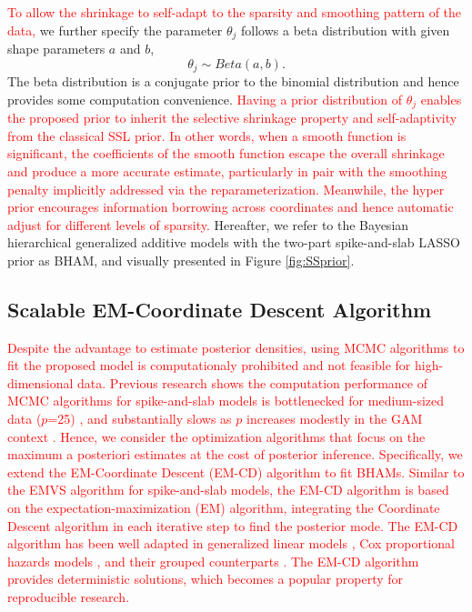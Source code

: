 \documentclass[AMA,STIX1COL,]{WileyNJD-v2}
\begin{document}
\textcolor{red}{To allow the shrinkage to self-adapt to the sparsity and smoothing pattern of the data, }we
further specify the parameter \(\theta_j\) follows a beta distribution
with given shape parameters \(a\) and \(b\), \[
\theta_j \sim Beta(a, b).
\] The beta distribution is a conjugate prior to the binomial
distribution and hence provides some computation convenience.
\textcolor{red}{Having a prior distribution of $\theta_j$ enables the proposed prior to inherit the selective shrinkage property and self-adaptivity \cite{Bai2021Review} from the classical SSL prior. In other words, when a smooth function is significant, the coefficients of the smooth function escape the overall shrinkage and produce a more accurate estimate, particularly in pair with the smoothing penalty implicitly addressed via the reparameterization. Meanwhile, the hyper prior encourages information borrowing across coordinates and hence automatic adjust for different levels of sparsity.}
Hereafter, we refer to the Bayesian hierarchical generalized additive
models with the two-part spike-and-slab LASSO prior as BHAM, and
visually presented in Figure \ref{fig:SSprior}.

\subsection{Scalable EM-Coordinate Descent Algorithm}

\textcolor{red}{Despite the advantage to estimate posterior densities, using MCMC algorithms to fit the proposed model is computationaly prohibited and not feasible for high-dimensional data. Previous research shows the computation performance of MCMC algorithms for spike-and-slab models is bottlenecked for medium-sized data ($p$=25) \cite{George1997}, and substantially slows as $p$ increases modestly in the GAM context \cite{Scheipl2013}. Hence, we consider the optimization algorithms that focus on the maximum a posteriori estimates at the cost of posterior inference. Specifically, we
extend the EM-Coordinate Descent (EM-CD) algorithm to fit BHAMs. Similar to the EMVS algorithm \cite{Rockova2014a} for spike-and-slab models, the EM-CD algorithm is based on the expectation-maximization (EM) algorithm, integrating the Coordinate Descent algorithm in each iterative step to find the posterior mode. The EM-CD algorithm has been well adapted in generalized linear models \cite{Tang2017a}, Cox proportional hazards models \cite{Tang2017}, and their grouped counterparts \cite{Tang2018, Tang2019}. The EM-CD algorithm provides deterministic solutions, which becomes a popular property for reproducible research.}
\end{document}
